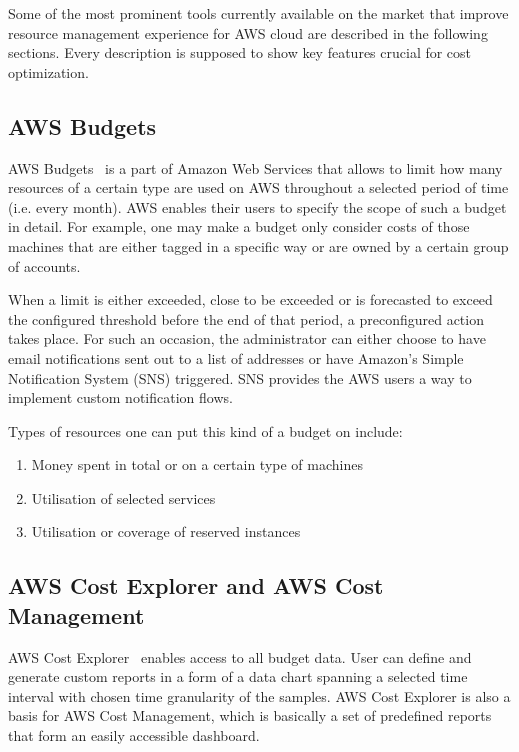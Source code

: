 \documentclass[licencjacka,en]{thesisclass}
\begin{document}
    Some of the most prominent tools currently available
    on the market that improve resource management experience
    for AWS cloud are described in the following sections.
    Every description is supposed to show key features crucial for cost optimization.

    \subsection{AWS Budgets}

    AWS Budgets~\cite{AWSDocs} is a part of Amazon Web Services that allows
    to limit how many resources of a certain type are used on AWS
    throughout a selected period of time (i.e. every month).
    AWS enables their users to specify the scope of such a budget in detail.
    For example, one may make a budget only consider costs of those machines
    that are either tagged in a specific way
    or are owned by a certain group of accounts.

    When a limit is either exceeded, close to be exceeded or is forecasted
    to exceed the configured threshold before the end of that period,
    a preconfigured action takes place.
    For such an occasion, the administrator can either choose
    to have email notifications sent out to a list of addresses
    or have Amazon's Simple Notification System (SNS) triggered.
    SNS provides the AWS users a way to implement custom notification flows.

    Types of resources one can put this kind of a budget on include:

    \begin{enumerate}
        \item Money spent in total or on a certain type of machines
        \item Utilisation of selected services
        \item Utilisation or coverage of reserved instances
    \end{enumerate}

    \subsection{AWS Cost Explorer and AWS Cost Management}

    AWS Cost Explorer~\cite{CostExplorer} enables access to all budget data.
    User can define and generate custom reports in a form
    of a data chart spanning a selected time interval
    with chosen time granularity of the samples.
    AWS Cost Explorer is also a basis for AWS Cost Management,
    which is basically a set of predefined reports
    that form an easily accessible dashboard.
\end{document}
